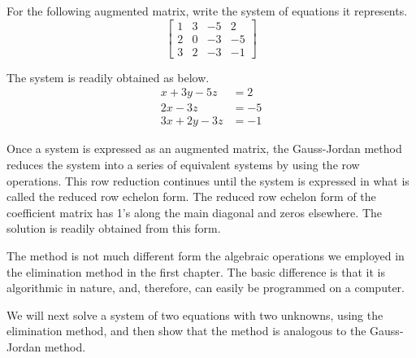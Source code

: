 \begin{example}
    For the following augmented matrix, write the system of equations it represents.
    \[
        \left[
            \begin{array}{ccc|c}
                1 & 3 & -5 & 2  \\
                2 & 0 & -3 & -5 \\
                3 & 2 & -3 & -1
            \end{array}
            \right]
    \]
\end{example}
\begin{solution}
    The system is readily obtained as below.
    \begin{align*}
        x + 3y - 5z  & = 2  \\
        2x      - 3z & = -5 \\
        3x + 2y - 3z & = -1
    \end{align*}
\end{solution}
Once a system is expressed as an augmented matrix, the Gauss-Jordan method reduces the system into a series of equivalent systems by using the row operations. This row reduction continues until the system is expressed in what is called the reduced row echelon form. The reduced row echelon form of the coefficient matrix has 1's along the main diagonal and zeros elsewhere. The solution is readily obtained from this form.

The method is not much different form the algebraic operations we employed in the elimination method in the first chapter.  The basic difference is that it is algorithmic in nature, and, therefore, can easily be programmed on a computer.

We will next solve a system of two equations with two unknowns, using the elimination method, and then show that the method is analogous to the Gauss-Jordan method.

